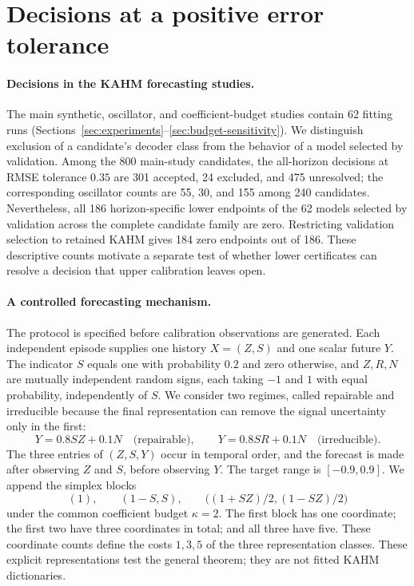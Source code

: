 \section{Decisions at a positive error tolerance}
\label{sec:decision-value}

\paragraph{Decisions in the KAHM forecasting studies.}
The main synthetic, oscillator, and coefficient-budget studies contain 62
fitting runs (Sections~\ref{sec:experiments}--\ref{sec:budget-sensitivity}).
We distinguish exclusion of a candidate's decoder class from the behavior
of a model selected by validation. Among the 800 main-study candidates, the all-horizon decisions at
RMSE tolerance $0.35$ are 301 accepted, 24 excluded, and 475 unresolved;
the corresponding oscillator counts are 55, 30, and 155 among 240 candidates.
Nevertheless, all 186 horizon-specific lower endpoints of the 62 models
selected by validation across the complete candidate family are zero.
Restricting validation selection to retained KAHM gives 184 zero endpoints
out of 186. These descriptive counts motivate a separate test of whether
lower certificates can resolve a decision that upper calibration leaves open.

\paragraph{A controlled forecasting mechanism.}
The protocol is specified before calibration observations are generated.
Each independent episode supplies one history $X=(Z,S)$ and one scalar future
$Y$. The indicator $S$ equals one with probability $0.2$ and zero otherwise,
and $Z,R,N$ are mutually independent random signs, each taking $-1$ and $1$
with equal probability, independently of $S$. We consider two regimes, called
repairable and irreducible because the final
representation can remove the signal uncertainty only in the first:
\[
  Y=0.8SZ+0.1N \quad\text{(repairable)},\qquad
  Y=0.8SR+0.1N \quad\text{(irreducible)}.
\]
The three entries of $(Z,S,Y)$ occur in temporal order, and the forecast is
made after observing $Z$ and $S$, before observing $Y$. The target range is
$[-0.9,0.9]$. We append the simplex
blocks
\[
 (1),\qquad (1-S,S),\qquad
 \bigl((1+SZ)/2,(1-SZ)/2\bigr)
\]
under the common coefficient budget $\kappa=2$. The first block has one
coordinate; the first two have three coordinates in
total; and all three have five. These coordinate counts define the costs
$1,3,5$ of the three representation classes. These explicit representations
test the general theorem; they are not fitted KAHM dictionaries.


